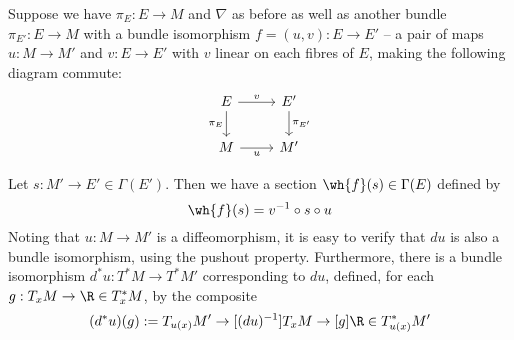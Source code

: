 \documentclass[\PRJWD/Thick_TQFTs_and_Quantum_Information.tex]{subfiles}
\begin{document}
Suppose we have $\pi_E : E \to M$ and $\nabla$ as before as well as another
bundle $\pi_{E'} : E \to M$ with a bundle isomorphism $f = (u, v) : E \to E'$ --
a pair of maps $u : M \to M'$ and $v : E \to E'$ with $v$ linear on each fibres
of $E$, making the following diagram commute:
\[\begin{tikzcd}
E \ar[d, "\pi_E" left] \ar[r, "v" above] & E' \ar[d, "\pi_{E'}" right]\\
M \ar[r, "u" below] & M'
\end{tikzcd}\]

Let $s : M' \to E' \in \Gamma(E')$. Then we have a section
$\wh{f}(s) \in \Gamma(E)$ defined by
\[
  \wh{f}(s) = v^{-1} \circ s \circ u
\]
Noting that $u : M \to M'$ is a diffeomorphism, it is easy to verify that $du$
is also a bundle isomorphism, using the pushout property. Furthermore, there is
a bundle isomorphism $d^*u : T^*M \to T^*M'$ corresponding to $du$, defined, for
each $g : T_xM \to \R \in T^*_xM$, by the composite
\[
  (d^*u)(g) := T_{u(x)}M' \to[(du)^{-1}] T_xM \to[g] \R \in T^*_{u(x)}M'
\]
\end{document}
